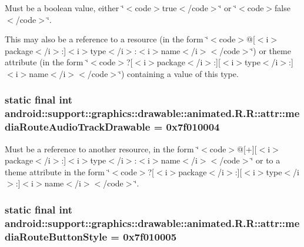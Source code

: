 Must be a boolean value, either \char`\"{}$<$code$>$true$<$/code$>$\char`\"{} or \char`\"{}$<$code$>$false$<$/code$>$\char`\"{}. 

This may also be a reference to a resource (in the form \char`\"{}$<$code$>$@\mbox{[}$<$i$>$package$<$/i$>$:\mbox{]}$<$i$>$type$<$/i$>$:$<$i$>$name$<$/i$>$$<$/code$>$\char`\"{}) or theme attribute (in the form \char`\"{}$<$code$>$?\mbox{[}$<$i$>$package$<$/i$>$:\mbox{]}\mbox{[}$<$i$>$type$<$/i$>$:\mbox{]}$<$i$>$name$<$/i$>$$<$/code$>$\char`\"{}) containing a value of this type. \hypertarget{classandroid_1_1support_1_1graphics_1_1drawable_1_1animated_1_1_r_1_1attr_7b6a23253225f2b04e501c0f3eb58960}{
\subsubsection[{mediaRouteAudioTrackDrawable}]{\setlength{\rightskip}{0pt plus 5cm}static final int android::support::graphics::drawable::animated.R.R::attr::mediaRouteAudioTrackDrawable = 0x7f010004}}
\label{classandroid_1_1support_1_1graphics_1_1drawable_1_1animated_1_1_r_1_1attr_7b6a23253225f2b04e501c0f3eb58960}


Must be a reference to another resource, in the form \char`\"{}$<$code$>$@\mbox{[}+\mbox{]}\mbox{[}$<$i$>$package$<$/i$>$:\mbox{]}$<$i$>$type$<$/i$>$:$<$i$>$name$<$/i$>$$<$/code$>$\char`\"{} or to a theme attribute in the form \char`\"{}$<$code$>$?\mbox{[}$<$i$>$package$<$/i$>$:\mbox{]}\mbox{[}$<$i$>$type$<$/i$>$:\mbox{]}$<$i$>$name$<$/i$>$$<$/code$>$\char`\"{}. \hypertarget{classandroid_1_1support_1_1graphics_1_1drawable_1_1animated_1_1_r_1_1attr_bd5302f6c71bb890d7fa66d29e58a575}{
\subsubsection[{mediaRouteButtonStyle}]{\setlength{\rightskip}{0pt plus 5cm}static final int android::support::graphics::drawable::animated.R.R::attr::mediaRouteButtonStyle = 0x7f010005}}
\label{classandroid_1_1support_1_1graphics_1_1drawable_1_1animated_1_1_r_1_1attr_bd5302f6c71bb890d7fa66d29e58a575}


